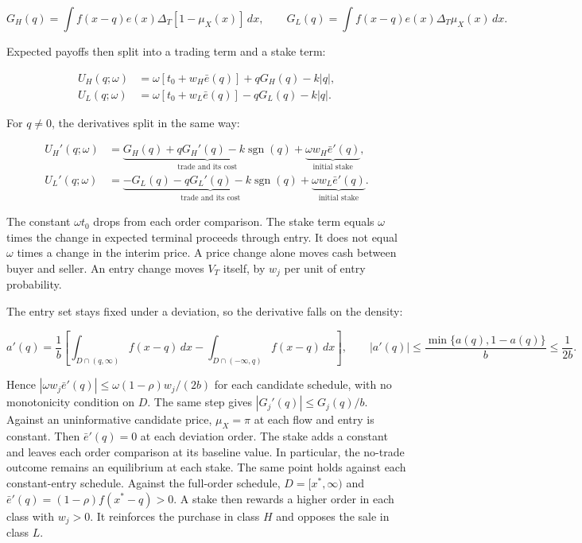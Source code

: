 \[
G_H(q)=\int f(x-q)e(x)\Delta_T[1-\mu_X(x)]\,dx,\qquad
G_L(q)=\int f(x-q)e(x)\Delta_T\mu_X(x)\,dx.
\]

Expected payoffs then split into a trading term and a stake term:

\[
\begin{aligned}
U_H(q;\omega)&=\omega[t_0+w_H\bar e(q)]+qG_H(q)-k|q|,\\
U_L(q;\omega)&=\omega[t_0+w_L\bar e(q)]-qG_L(q)-k|q|.
\end{aligned}
\]

For \(q\ne 0\), the derivatives split in the same way:

\[
\begin{aligned}
U_H'(q;\omega)&=
\underbrace{G_H(q)+qG_H'(q)-k\operatorname{sgn}(q)}_{\text{trade and its cost}}
+\underbrace{\omega w_H\bar e'(q)}_{\text{initial stake}},\\
U_L'(q;\omega)&=
\underbrace{-G_L(q)-qG_L'(q)-k\operatorname{sgn}(q)}_{\text{trade and its cost}}
+\underbrace{\omega w_L\bar e'(q)}_{\text{initial stake}}.
\end{aligned}
\]

The constant \(\omega t_0\) drops from each order comparison. The
stake term equals \(\omega\) times the change in expected terminal
proceeds through entry. It does not equal \(\omega\) times a change
in the interim price. A price change alone moves cash between buyer
and seller. An entry change moves \(V_T\) itself, by \(w_j\) per
unit of entry probability.

The entry set stays fixed under a deviation, so the derivative
falls on the density:

\[
a'(q)=\frac1b\left[\int_{D\cap(q,\infty)}f(x-q)\,dx
-\int_{D\cap(-\infty,q)}f(x-q)\,dx\right],
\qquad
|a'(q)|\le\frac{\min\{a(q),1-a(q)\}}b\le\frac1{2b}.
\]

Hence \(|\omega w_j\bar e'(q)|\le\omega(1-\rho)w_j/(2b)\) for each
candidate schedule, with no monotonicity condition on \(D\). The
same step gives \(|G_j'(q)|\le G_j(q)/b\). Against an uninformative
candidate price, \(\mu_X=\pi\) at each flow and entry is constant.
Then \(\bar e'(q)=0\) at each deviation order. The stake adds a
constant and leaves each order comparison at its baseline value.
In particular, the no-trade outcome remains an equilibrium at each
stake. The same point holds against each constant-entry schedule.
Against the full-order schedule, \(D=[x^*,\infty)\) and
\(\bar e'(q)=(1-\rho)f(x^*-q)>0\). A stake then rewards a higher
order in each class with \(w_j>0\). It reinforces the purchase in
class \(H\) and opposes the sale in class \(L\).

